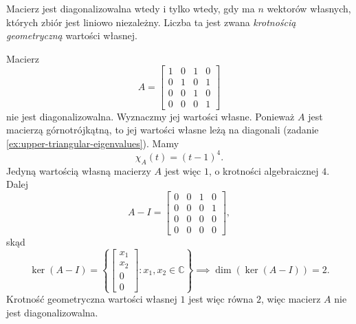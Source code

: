 Macierz jest diagonalizowalna wtedy i tylko wtedy,
	gdy ma $n$ wektorów własnych,
	których zbiór jest liniowo niezależny.
Liczba ta jest zwana \textit{krotnością geometryczną} wartości własnej.


\begin{example}
	Macierz
	\begin{equation}
		A = \left[\begin{matrix}
			1 & 0 & 1 & 0 \\
			0 & 1 & 0 & 1 \\
			0 & 0 & 1 & 0 \\
			0 & 0 & 0 & 1
		\end{matrix}\right]
	\end{equation}
	nie jest diagonalizowalna.
	Wyznaczmy jej wartości własne.
	Ponieważ $A$ jest macierzą górnotrójkątną,
		to jej wartości własne leżą na diagonali (zadanie \ref{ex:upper-triangular-eigenvalues}).
	Mamy
	\begin{equation}
		\chi_A(t) = (t - 1)^4.
	\end{equation}
	Jedyną wartością własną macierzy $A$ jest więc $1$,
	o krotności algebraicznej $4$.
	Dalej
	\begin{equation}
		A - I = \left[\begin{matrix}
			0 & 0 & 1 & 0 \\
			0 & 0 & 0 & 1 \\
			0 & 0 & 0 & 0 \\
			0 & 0 & 0 & 0
		\end{matrix}\right],
	\end{equation}
	skąd
	\begin{equation}
		\ker(A - I) = \left\{\left[\begin{matrix}
			x_1 \\
			x_2 \\
			0 \\
			0
		\end{matrix}\right] : x_1, x_2 \in \mathbb{C}\right\}
		\implies
		\dim(\ker(A - I)) = 2.
	\end{equation}
	Krotność geometryczna wartości własnej $1$ jest więc równa $2$,
		więc macierz $A$ nie jest diagonalizowalna.
\end{example}

